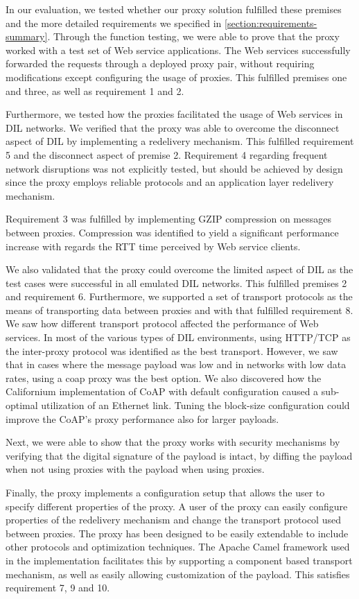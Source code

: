 In our evaluation, we tested whether our proxy solution fulfilled these premises
and the more detailed requirements we specified in
\cref{section:requirements-summary}. Through the function testing, we were able
to prove that the proxy worked with a test set of Web service applications. The
Web services successfully forwarded the requests through a deployed proxy pair,
without requiring modifications except configuring the usage of proxies. This
fulfilled premises one and three, as well as requirement 1 and 2.

Furthermore, we tested how the proxies facilitated the usage of Web services in
DIL networks. We verified that the proxy was able to overcome the disconnect
aspect of DIL by implementing a redelivery mechanism. This fulfilled requirement
5 and the disconnect aspect of premise 2. Requirement 4 regarding frequent
network disruptions was not explicitly tested, but should be achieved by design
since the proxy employs reliable protocols and an application layer redelivery
mechanism.

Requirement 3 was fulfilled by implementing GZIP compression on messages between
proxies. Compression was identified to yield a significant performance increase
with regards the RTT time perceived by Web service clients.

We also validated that the proxy could overcome the limited aspect of DIL as the
test cases were successful in all emulated DIL networks. This fulfilled premises
2 and requirement 6. Furthermore, we supported a set of transport protocols as
the means of transporting data between proxies and with that fulfilled
requirement 8. We saw how different transport protocol affected the performance
of Web services. In most of the various types of DIL environments, using
HTTP/TCP as the inter-proxy protocol was identified as the best transport.
However, we saw that in cases where the message payload was low and in networks
with low data rates, using a \gls{coap} proxy was the best option. We also
discovered how the Californium implementation of CoAP with default configuration
caused a sub-optimal utilization of an Ethernet link. Tuning the block-size
configuration could improve the CoAP's proxy performance also for larger
payloads.

Next, we were able to show that the proxy works with security mechanisms by
verifying that the digital signature of the payload is intact, by diffing the
payload when not using proxies with the payload when using proxies.

Finally, the proxy implements a configuration setup that allows the user to
specify different properties of the proxy. A user of the proxy can easily
configure properties of the redelivery mechanism and change the transport
protocol used between proxies. The proxy has been designed to be easily
extendable to include other protocols and optimization techniques. The Apache
Camel framework used in the implementation facilitates this by supporting a
component based transport mechanism, as well as easily allowing customization of
the payload. This satisfies requirement 7, 9 and 10.


